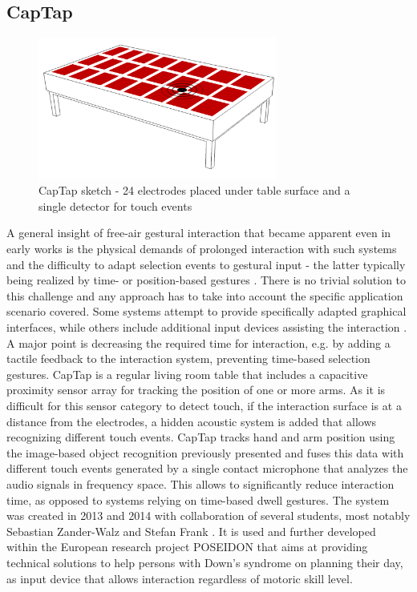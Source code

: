 \subsection{CapTap}
\begin{figure}[h]
\centering
\includegraphics[width=0.7\textwidth]{images/captap_v2}
\caption{CapTap sketch - 24 electrodes placed under table surface and a single detector for touch events}
\label{fig:captap_sketch}
\end{figure}
A general insight of free-air gestural interaction that became apparent even in early works is the physical demands of prolonged interaction with such systems \cite{Baudel1993, lenman2002} and the difficulty to adapt selection events to gestural input - the latter typically being realized by time- or position-based gestures \cite{Baudel1993,Krum2002}. There is no trivial solution to this challenge and any approach has to take into account the specific application scenario covered. Some systems attempt to provide specifically adapted graphical interfaces, while others include additional input devices assisting the interaction \cite{Wu2003,Zimmerman1986}. A major point is decreasing the required time for interaction, e.g. by adding a tactile feedback to the interaction system, preventing time-based selection gestures. CapTap is a regular living room table that includes a capacitive proximity sensor array for tracking the position of one or more arms. As it is difficult for this sensor category to detect touch, if the interaction surface is at a distance from the electrodes, a hidden acoustic system is added that allows recognizing different touch events. CapTap tracks hand and arm position using the image-based object recognition previously presented and fuses this data with different touch events generated by a single contact microphone that analyzes the audio signals in frequency space. This allows to significantly reduce interaction time, as opposed to systems relying on time-based dwell gestures. The system was created in 2013 and 2014 with collaboration of several students, most notably Sebastian Zander-Walz and Stefan Frank \cite{Braun2013captap}. It is used and further developed within the European research project POSEIDON that aims at providing technical solutions to help persons with Down's syndrome on planning their day, as input device that allows interaction regardless of motoric skill level.
